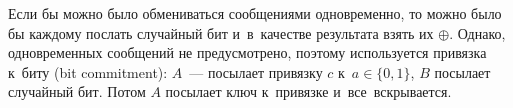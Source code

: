 \documentclass{article}
\begin{document}
Если бы можно было обмениваться сообщениями одновременно, то можно было бы
каждому послать случайный бит и~в~качестве результата взять их $\oplus$. Однако,
одновременных сообщений не предусмотрено, поэтому используется привязка к~биту
(bit commitment): $A$~--- посылает привязку $c$ к~$a \in \{0, 1\}$, $B$ посылает
случайный бит. Потом $A$ посылает ключ к~привязке и~все~вскрывается.
\end{document}
